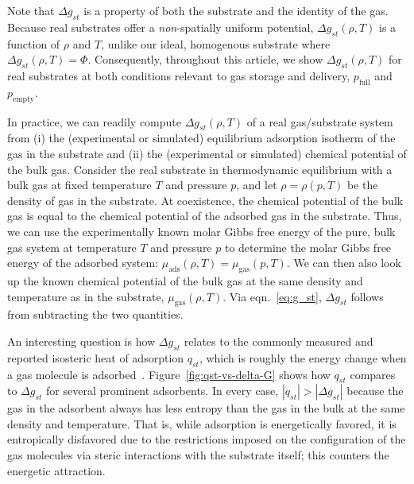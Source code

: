 \documentclass[twoside,twocolumn,9pt]{article}
\newcommand\V{\Phi}
\newcommand\pfull{\ensuremath{p_{\text{full}}}}
\newcommand\pempty{\ensuremath{p_{\text{empty}}}}
\newcommand\gst{\ensuremath{\Delta g_{st}}}
\begin{document}
Note that $\gst$ is a property
of both the substrate and the identity of the gas. Because real substrates
offer a \emph{non}-spatially uniform potential, $\gst(\rho, T)$ is a function
of $\rho$ and $T$, unlike our ideal, homogenous substrate where $\gst(\rho,
T)=\V$. Consequently, throughout this article, we show $\gst(\rho, T)$ for real
substrates at both conditions relevant to gas storage and delivery, $\pfull$
and $\pempty$.

In practice, we can readily compute $\gst(\rho, T)$ of a real gas/substrate
system from (i) the (experimental or simulated) equilibrium adsorption isotherm
of the gas in the substrate and (ii) the (experimental or simulated) chemical
potential of the bulk gas. Consider the real substrate in thermodynamic
equilibrium with a bulk gas at fixed temperature $T$ and pressure $p$, and let
$\rho=\rho(p, T)$ be the density of gas in the substrate. At coexistence, the
chemical potential of the bulk gas is equal to the chemical potential of the
adsorbed gas in the substrate. Thus, we can use the experimentally known molar
Gibbs free energy of the pure, bulk gas system at temperature $T$ and pressure
$p$ to determine the molar Gibbs free energy of the adsorbed system:
$\mu_{\text{ads}}(\rho, T)=\mu_{\text{gas}}(p, T)$. We can then also look up
the known chemical potential of the bulk gas at the same density and
temperature as in the substrate, $\mu_{\text{gas}}(\rho, T)$. Via
eqn.~\ref{eq:g_st}, $\gst$ follows from subtracting the two quantities.

An interesting question is how $\gst$ relates to the commonly measured and
reported isosteric heat of adsorption $q_{st}$, which is roughly the energy
change when a gas molecule is adsorbed~\cite{sircar1999isosteric,
tian2017differential}. Figure~\ref{fig:qst-vs-delta-G} shows how $q_{st}$
compares to $\gst$ for several prominent adsorbents. In every case,
$|q_{st}|>|\gst|$ because the gas in the adsorbent always has less entropy than
the gas in the bulk at the same density and temperature. That is, while
adsorption is energetically favored, it is entropically disfavored due to the
restrictions imposed on the configuration of the gas molecules via steric
interactions with the substrate itself; this counters the energetic attraction.
\end{document}
